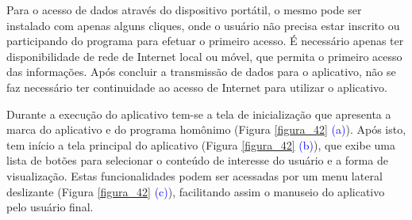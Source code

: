 Para o acesso de dados através do dispositivo portátil, o mesmo pode ser instalado com apenas alguns cliques, onde o usuário não precisa estar inscrito ou participando do programa para efetuar o primeiro acesso. É necessário apenas ter disponibilidade de rede de Internet local ou móvel, que permita o primeiro acesso das informações. Após concluir a transmissão de dados para o aplicativo, não se faz necessário ter continuidade ao acesso de Internet para utilizar o aplicativo.


Durante a execução do aplicativo tem-se a tela de inicialização que apresenta a marca do aplicativo e do programa homônimo (Figura \ref{figura_42} \textcolor{blue}{(a)}). Após isto, tem início a tela principal do aplicativo (Figura \ref{figura_42} \textcolor{blue}{(b)}), que exibe uma lista de botões para selecionar o conteúdo de interesse do usuário e a forma de visualização. Estas funcionalidades podem ser acessadas por um menu lateral deslizante (Figura \ref{figura_42} \textcolor{blue}{(c)}), facilitando assim o manuseio do aplicativo pelo usuário final. 



